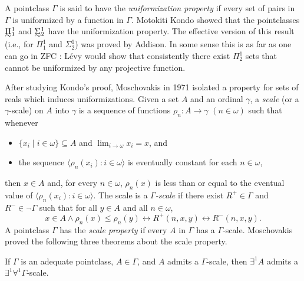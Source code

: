 \documentclass{book}%
\def\underTilde#1{{\baselineskip=0pt\vtop{\hbox{$#1$}\hbox{$\sim$}}}{}}
\newcommand{\uTPi}{\underTilde{\Pi}}
\newcommand{\uTSigma}{\underTilde{\Sigma}}
\begin{document}
A pointclass $\Gamma$ is said to have the \emph{uniformization property}
if every set of pairs in $\Gamma$ is uniformized by a function in $\Gamma$. Motokiti Kondo  showed
that the pointclasses $\uTPi^{1}_{1}$ and $\uTSigma^{1}_{2}$ have the uniformization property.
The effective version of this result (i.e., for $\Pi^{1}_{1}$ and $\Sigma^{1}_{2}$) was proved by Addison.
In some sense this is as far as one can go in ZFC : L\'{e}vy  would show that consistently there exist $\Pi^{1}_{2}$ sets that cannot be uniformized by any projective function.




After studying Kondo's proof, Moschovakis in 1971 isolated a property
for sets of reals which induces uniformizations.
Given a set $A$ and an ordinal $\gamma$, a
\emph{scale}
(or a $\gamma$-scale) on $A$ into $\gamma$ is a sequence of
functions $\rho_{n}\colon A \to \gamma$ $(n \in \omega)$ such that
whenever
\begin{itemize}
\item $\{ x_{i} \mid i \in \omega\} \subseteq A$ and
$\lim_{i\to\omega}x_{i} = x$, and
\item the sequence $\langle \rho_{n}(x_{i}) : i \in \omega \rangle$ is eventually constant for each $n \in \omega$,
\end{itemize}
then $x \in A$ and, for every $n \in \omega$, $\rho_{n}(x)$ is less
than or equal to the eventual value of $\langle \rho_{n}(x_{i}) : i
\in \omega \rangle$. The scale is a
\emph{$\Gamma$-scale}
if there exist $R^{+} \in \Gamma$ and $R^{-} \in \neg\Gamma$ such that for all $y
\in A$ and all $n \in \omega$,
$$x \in A \wedge \rho_{n}(x) \leq \rho_{n}(y) \leftrightarrow
R^{+}(n,x,y) \leftrightarrow R^{-}(n,x,y).$$ A pointclass $\Gamma$
has the \emph{scale property} if every $A$ in
$\Gamma$ has a $\Gamma$-scale.
Moschovakis  proved the following three theorems about the scale property.

\begin{theorem} If\/ $\Gamma$ is an adequate pointclass, $A \in \Gamma$, and $A$ admits a $\Gamma$-scale, then
$\exists^{1} A$ admits a $\exists^{1}\forall^{1}\Gamma$-scale.
\end{theorem}
\end{document}
